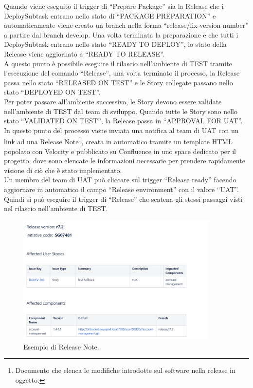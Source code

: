 \documentclass[a4paper, 12pt]{report}
\numberwithin{equation}{section}
\begin{document}
Quando viene eseguito il trigger di “Prepare Package” sia la Release che i DeploySubtask entrano nello stato di “PACKAGE PREPARATION” e automaticamente viene creato un branch nella forma “release/fix-version-number” a partire dal branch develop. Una volta terminata la preparazione e che tutti i DeploySubtask entrano nello stato “READY TO DEPLOY”, lo stato della Release viene aggiornato a “READY TO RELEASE”.\\
A questo punto è possibile eseguire il rilascio nell’ambiente di TEST tramite l’esecuzione del comando “Release”, una volta terminato il processo, la Release passa nello stato “RELEASED ON TEST” e le Story collegate passano nello stato “DEPLOYED ON TEST”.\\
Per poter passare all’ambiente successivo, le Story devono essere validate nell’ambiente di TEST dal team di sviluppo. Quando tutte le Story sono nello stato “VALIDATED ON TEST”, la Release passa in “APPROVAL FOR UAT”.\\
In questo punto del processo viene inviata una notifica al team di UAT con un link ad una Release Note\footnote{Documento che elenca le modifiche introdotte sul software nella release in oggetto.}, creata in automatico tramite un template HTML popolato con Velocity e pubblicato su Confluence in uno space dedicato per il progetto, dove sono elencate le informazioni necessarie per prendere rapidamente visione di ciò che è stato implementato.\\
Un membro del team di UAT può cliccare sul trigger “Release ready” facendo aggiornare in automatico il campo “Release environment” con il valore “UAT”. Quindi si può eseguire il trigger di “Release” che scatena gli stessi passaggi visti nel rilascio nell’ambiente di TEST.
\begin{figure}
    \centering
    \includegraphics[width=0.9\textwidth]{imgs/release-note.png}
    \caption{Esempio di Release Note.}
    \label{fig:release-note}
\end{figure}
\end{document}
